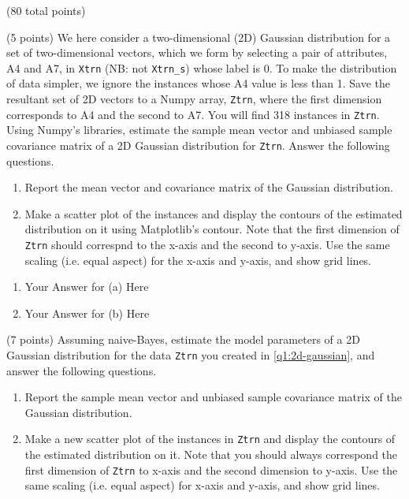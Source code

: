 \documentclass[12pt]{article}
\begin{document}
\begin{question}{(80 total points) \qOneTitle}
\begin{subquestion}{(5 points)
    We here consider a two-dimensional (2D) Gaussian distribution for
    a set of two-dimensional vectors, which we form by 
    selecting a pair of attributes, A4 and A7, in {\tt Xtrn} (NB: not {\tt Xtrn\_s}) whose label is 0.
    To make the distribution of data simpler, we ignore the instances whose A4 value is less than 1. 
    Save the resultant set of 2D vectors to a Numpy array, {\tt Ztrn}, where the first dimension corresponds to A4 and the second to A7.
    You will find 318 instances in {\tt Ztrn}.
  } \label{q1:2d-gaussian}
  Using Numpy's libraries, estimate the sample mean vector and unbiased sample covariance matrix of a 2D Gaussian distribution for {\tt Ztrn}. Answer the following questions.
  \begin{enumerate}\NARROWITEM
  \item Report the mean vector and covariance matrix of the Gaussian distribution.

  \item Make a scatter plot of the instances and display the contours of the estimated distribution on it using Matplotlib's contour.
    Note that the first dimension of {\tt Ztrn} should correspnd to the x-axis
    and the second to y-axis. Use the same scaling (i.e. equal aspect) for the x-axis and y-axis, and show grid lines.
  \end{enumerate}
   

  \begin{answerbox}{0.6\textheight}
    \begin{enumerate}
    \item Your Answer for (a) Here
    \item Your Answer for (b) Here
    \end{enumerate}
  \end{answerbox}
  


\end{subquestion}

\begin{subquestion}{(7 points)
    Assuming naive-Bayes, estimate the model parameters of a 2D Gaussian distribution for the data {\tt Ztrn} you created in \ref{q1:2d-gaussian}, and answer the following questions.
  } \label{q1:2d-gaussina:nv}
  \begin{enumerate}\NARROWITEM
  \item Report the sample mean vector and unbiased sample covariance matrix of the Gaussian distribution. 
  \item Make a new scatter plot of the instances in {\tt Ztrn} and display the contours of the estimated distribution on it.
    Note that you should always correspond the first dimension of {\tt Ztrn} to x-axis and the second dimension to y-axis. Use the same scaling (i.e. equal aspect) for x-axis and y-axis, and show grid lines.


\end{enumerate}
\end{subquestion}
\end{question}
\end{document}
